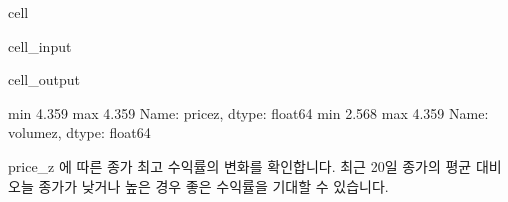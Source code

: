 \documentclass[letterpaper,10pt,english]{jupyterBook}
\begin{document}
\begin{sphinxuseclass}{cell}\begin{sphinxVerbatimInput}

\begin{sphinxuseclass}{cell_input}
\begin{sphinxVerbatim}[commandchars=\\\{\}]
    
\PYG{p}{[}\PYG{p}{]}\PYG{p}{[}\PYG{p}{]} 
\PYG{p}{[}\PYG{p}{]}\PYG{p}{[}\PYG{p}{]}
\end{sphinxVerbatim}

\end{sphinxuseclass}\end{sphinxVerbatimInput}
\begin{sphinxVerbatimOutput}

\begin{sphinxuseclass}{cell_output}
\begin{sphinxVerbatim}[commandchars=\\\{\}]
min   \PYGZhy{}4.359
max    4.359
Name: price\PYGZus{}z, dtype: float64
min   \PYGZhy{}2.568
max    4.359
Name: volume\PYGZus{}z, dtype: float64
\end{sphinxVerbatim}

\end{sphinxuseclass}\end{sphinxVerbatimOutput}

\end{sphinxuseclass}
\sphinxAtStartPar
 price\_z 에 따른 종가 최고 수익률의 변화를 확인합니다. 최근 20일 종가의 평균 대비 오늘 종가가 낮거나 높은 경우 좋은 수익률을 기대할 수 있습니다.
\end{document}
